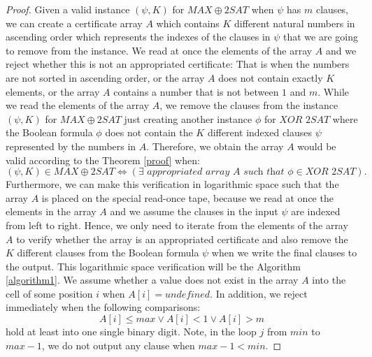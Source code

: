 \documentclass[a4paper,UKenglish,cleveref, autoref]{lipics-v2019}
\begin{document}
\begin{proof}
Given a valid instance $(\psi, K)$ for $MAX\oplus2SAT$ when $\psi$ has $m$ clauses, we can create a certificate array $A$ which contains $K$ different natural numbers in ascending order which represents the indexes of the clauses in $\psi$ that we are going to remove from the instance. We read at once the elements of the array $A$ and we reject whether this is not an appropriated certificate: That is when the numbers are not sorted in ascending order, or the array $A$ does not contain exactly $K$ elements, or the array $A$ contains a number that is not between $1$ and $m$. While we read the elements of the array $A$, we remove the clauses from the instance $(\psi, K)$ for $MAX\oplus2SAT$ just creating another instance $\phi$ for $\textit{XOR 2SAT}$ where the Boolean formula $\phi$ does not contain the $K$ different indexed clauses $\psi$ represented by the numbers in $A$. Therefore, we obtain the array $A$ would be valid according to the Theorem \ref{proof} when:
\[(\psi, K) \in MAX\oplus2SAT \Leftrightarrow (\exists \textit{ appropriated array } A \textit{ such that } \phi \in \textit{XOR 2SAT}).\]
Furthermore, we can make this verification in logarithmic space such that the array $A$ is placed on the special read-once tape, because we read at once the elements in the array $A$ and we assume the clauses in the input $\psi$ are indexed from left to right. Hence, we only need to iterate from the elements of the array $A$ to verify whether the array is an appropriated certificate and also remove the $K$ different clauses from the Boolean formula $\psi$ when we write the final clauses to the output. This logarithmic space verification will be the Algorithm \ref{algorithm1}. We assume whether a value does not exist in the array $A$ into the cell of some position $i$ when $A[i] = \textit{undefined}$. In addition, we reject immediately when the following comparisons:
\[A[i] \leq max \vee A[i] < 1 \vee A[i] > m\]
hold at least into one single binary digit. Note, in the loop $j$ from $min$ to $max - 1$, we do not output any clause when $max - 1 < min$.


\end{proof}
\end{document}
